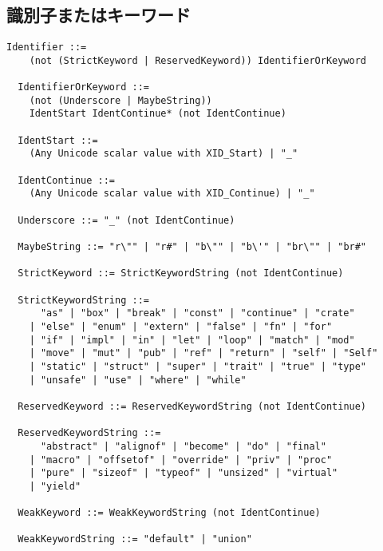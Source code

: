\documentclass[dvipdfmx,uplatex,papersize,a4paper,10pt]{jsbook}
\theoremstyle{definition}
\begin{document}
\subsection{識別子またはキーワード}

\begin{lstlisting}[gobble=2]
  Identifier ::=
    (not (StrictKeyword | ReservedKeyword)) IdentifierOrKeyword

  IdentifierOrKeyword ::=
    (not (Underscore | MaybeString))
    IdentStart IdentContinue* (not IdentContinue)

  IdentStart ::=
    (Any Unicode scalar value with XID_Start) | "_"

  IdentContinue ::=
    (Any Unicode scalar value with XID_Continue) | "_"

  Underscore ::= "_" (not IdentContinue)

  MaybeString ::= "r\"" | "r#" | "b\"" | "b\'" | "br\"" | "br#"

  StrictKeyword ::= StrictKeywordString (not IdentContinue)

  StrictKeywordString ::=
      "as" | "box" | "break" | "const" | "continue" | "crate"
    | "else" | "enum" | "extern" | "false" | "fn" | "for"
    | "if" | "impl" | "in" | "let" | "loop" | "match" | "mod"
    | "move" | "mut" | "pub" | "ref" | "return" | "self" | "Self"
    | "static" | "struct" | "super" | "trait" | "true" | "type"
    | "unsafe" | "use" | "where" | "while"

  ReservedKeyword ::= ReservedKeywordString (not IdentContinue)

  ReservedKeywordString ::=
      "abstract" | "alignof" | "become" | "do" | "final"
    | "macro" | "offsetof" | "override" | "priv" | "proc"
    | "pure" | "sizeof" | "typeof" | "unsized" | "virtual"
    | "yield"

  WeakKeyword ::= WeakKeywordString (not IdentContinue)

  WeakKeywordString ::= "default" | "union"
\end{lstlisting}
\end{document}
